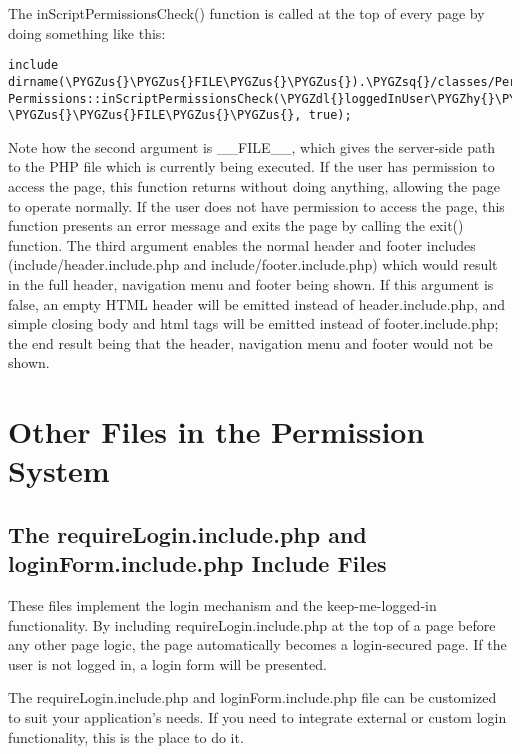 \documentclass[letterpaper,10pt,english]{sphinxmanual}
\def\PYGZus{\char`\_}
\def\PYGZgt{\char`\>}
\def\PYGZdl{\char`\$}
\def\PYGZhy{\char`\-}
\def\PYGZsq{\char`\'}
\renewcommand\PYGZsq{\textquotesingle}
\begin{document}
The inScriptPermissionsCheck() function is called at the top of every page by doing something like this:

\begin{Verbatim}[commandchars=\\\{\}]
include dirname(\PYGZus{}\PYGZus{}FILE\PYGZus{}\PYGZus{}).\PYGZsq{}/classes/Permissions.class.php\PYGZsq{};
Permissions::inScriptPermissionsCheck(\PYGZdl{}loggedInUser\PYGZhy{}\PYGZgt{}id, \PYGZus{}\PYGZus{}FILE\PYGZus{}\PYGZus{}, true);
\end{Verbatim}

Note how the second argument is \_\_FILE\_\_, which gives the server-side path to the PHP file which is
currently being executed.  If the user has permission to access the page, this function returns
without doing anything, allowing the page to operate normally.  If the user does not have permission
to access the page, this function presents an error message and exits the page by calling the exit()
function.  The third argument enables the normal header and footer includes
(include/header.include.php and include/footer.include.php) which would result in the full header,
navigation menu and footer being shown.  If this argument is false, an empty HTML header will be
emitted instead of header.include.php, and simple closing body and html tags will be emitted instead
of footer.include.php; the end result being that the header, navigation menu and footer would not be
shown.


\section{Other Files in the Permission System}
\label{jaxFrameworkGuide:other-files-in-the-permission-system}

\subsection{The requireLogin.include.php and loginForm.include.php Include Files}
\label{jaxFrameworkGuide:the-requirelogin-include-php-and-loginform-include-php-include-files}
These files implement the login mechanism and the keep-me-logged-in functionality.  By including
requireLogin.include.php at the top of a page before any other page logic, the page automatically
becomes a login-secured page.  If the user is not logged in, a login form will be presented.

The requireLogin.include.php and loginForm.include.php file can be customized to suit your
application's needs.  If you need to integrate external or custom login functionality, this is the
place to do it.
\end{document}
